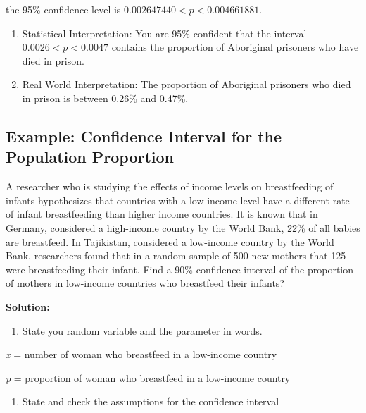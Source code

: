 \documentclass[
]{book}
\providecommand{\tightlist}{%
  \setlength{\itemsep}{0pt}\setlength{\parskip}{0pt}}
\begin{document}
the 95\% confidence level is \(0.002647440<p<0.004661881\).

\begin{enumerate}
\def\labelenumi{\arabic{enumi}.}
\setcounter{enumi}{3}
\item
  Statistical Interpretation: You are 95\% confident that the interval \(0.0026<p<0.0047\) contains the proportion of Aboriginal prisoners who have died in prison.
\item
  Real World Interpretation: The proportion of Aboriginal prisoners who died in prison is between 0.26\% and 0.47\%.
\end{enumerate}

\hypertarget{example-confidence-interval-for-the-population-proportion-1}{%
\subsection{Example: Confidence Interval for the Population Proportion}\label{example-confidence-interval-for-the-population-proportion-1}}

A researcher who is studying the effects of income levels on breastfeeding of infants hypothesizes that countries with a low income level have a different rate of infant breastfeeding than higher income countries. It is known that in Germany, considered a high-income country by the World Bank, 22\% of all babies are breastfeed. In Tajikistan, considered a low-income country by the World Bank, researchers found that in a random sample of 500 new mothers that 125 were breastfeeding their infant. Find a 90\% confidence interval of the proportion of mothers in low-income countries who breastfeed their infants?

\textbf{Solution:}

\begin{enumerate}
\def\labelenumi{\arabic{enumi}.}
\tightlist
\item
  State you random variable and the parameter in words.
\end{enumerate}

\emph{x} = number of woman who breastfeed in a low-income country

\emph{p} = proportion of woman who breastfeed in a low-income country

\begin{enumerate}
\def\labelenumi{\arabic{enumi}.}
\setcounter{enumi}{1}
\tightlist
\item
  State and check the assumptions for the confidence interval
\end{enumerate}
\end{document}
